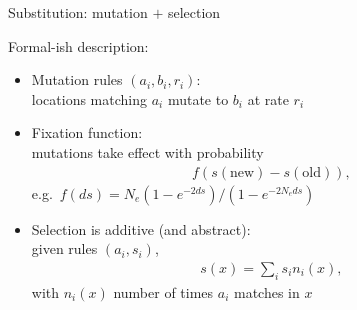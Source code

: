 \documentclass[smaller]{beamer}
\begin{document}
\begin{frame}{Substitution: mutation $+$ selection}

  {\struct Formal-ish description:}

  \begin{itemize}

    \item {\newthing Mutation} rules $(a_i,b_i,r_i)$: \\
      locations matching $a_i$ mutate to $b_i$ at rate $r_i$ \\

    \item {\newthing Fixation} function: \\
      mutations take effect with probability 
      \begin{align*}
        f(s(\text{new}) - s(\text{old})) ,
      \end{align*}
      e.g.\ $f(ds) = N_e (1-e^{-2 ds})/(1-e^{-2 N_e ds})$

    \item {\newthing Selection} is additive (and abstract):\\
      given rules $(a_i,s_i)$,
      \begin{align*}
        s(x) = \sum_i s_i n_i(x),
      \end{align*}
      with $n_i(x)$ number of times $a_i$ matches in $x$
      

  \end{itemize}

\end{frame}
\end{document}
